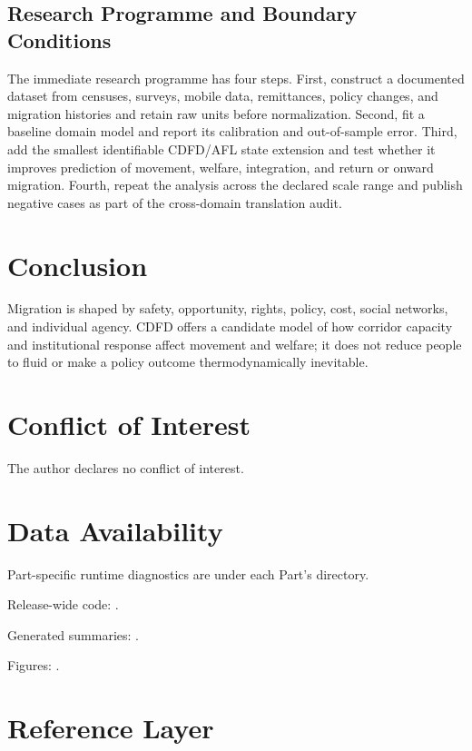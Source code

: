 \documentclass[11pt,a4paper]{article}
\begin{document}
\subsection{Research Programme and Boundary Conditions}

The immediate research programme has four steps. First, construct a documented
dataset from censuses, surveys, mobile data, remittances, policy changes, and migration histories and retain raw units before normalization.
Second, fit a baseline domain model and report its calibration and out-of-sample
error. Third, add the smallest identifiable CDFD/AFL state extension and test
whether it improves prediction of movement, welfare, integration, and return or onward migration. Fourth, repeat the
analysis across the declared scale range and publish negative cases as part of
the cross-domain translation audit.


\section{Conclusion}
Migration is shaped by safety, opportunity, rights, policy, cost, social networks, and individual agency. CDFD offers a candidate model of how corridor capacity and institutional response affect movement and welfare; it does not reduce people to fluid or make a policy outcome thermodynamically inevitable.
\section*{Conflict of Interest} The author declares no conflict of interest.
\section*{Data Availability}
Part-specific runtime diagnostics are under each Part's  directory.

Release-wide code: .

Generated summaries: .

Figures: .


\section{Reference Layer}


\end{document}
